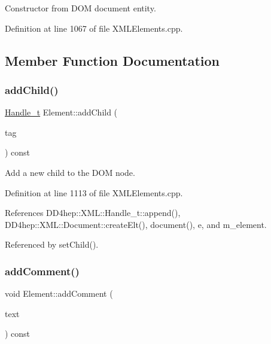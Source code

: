 Constructor from D\+OM document entity. 



Definition at line 1067 of file X\+M\+L\+Elements.\+cpp.



\subsection{Member Function Documentation}
\hypertarget{class_d_d4hep_1_1_x_m_l_1_1_element_ab2db1252475a942e0e255660c2377f0e}{}\label{class_d_d4hep_1_1_x_m_l_1_1_element_ab2db1252475a942e0e255660c2377f0e} 
\subsubsection{\texorpdfstring{add\+Child()}{addChild()}}
{\footnotesize\ttfamily \hyperlink{class_d_d4hep_1_1_x_m_l_1_1_handle__t}{Handle\+\_\+t} Element\+::add\+Child (\begin{DoxyParamCaption}\item[{const \hyperlink{namespace_d_d4hep_1_1_x_m_l_a09e5d9cc86ed782f6826dfe0778c1815}{Xml\+Char} $\ast$}]{tag }\end{DoxyParamCaption}) const}



Add a new child to the D\+OM node. 



Definition at line 1113 of file X\+M\+L\+Elements.\+cpp.



References D\+D4hep\+::\+X\+M\+L\+::\+Handle\+\_\+t\+::append(), D\+D4hep\+::\+X\+M\+L\+::\+Document\+::create\+Elt(), document(), e, and m\+\_\+element.



Referenced by set\+Child().

\hypertarget{class_d_d4hep_1_1_x_m_l_1_1_element_ac3dd678d5df495ea9e62b664b4b3fc0b}{}\label{class_d_d4hep_1_1_x_m_l_1_1_element_ac3dd678d5df495ea9e62b664b4b3fc0b} 
\subsubsection{\texorpdfstring{add\+Comment()}{addComment()}}
{\footnotesize\ttfamily void Element\+::add\+Comment (\begin{DoxyParamCaption}\item[{const char $\ast$}]{text }\end{DoxyParamCaption}) const}



